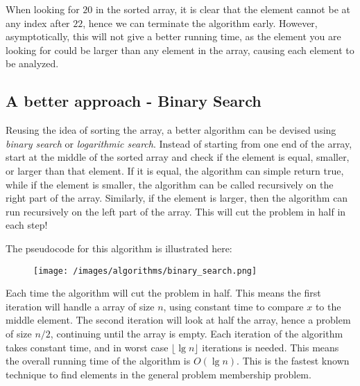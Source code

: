     When looking for $20$ in the sorted array, it is clear that the element cannot be at any index after $22$, hence we can terminate the algorithm early.
    However, asymptotically, this will not give a better running time, as the element you are looking for could be larger than any element in the array, causing each element to be analyzed.

    \subsection{A better approach - Binary Search}

        Reusing the idea of sorting the array, a better algorithm can be devised using \emph{binary search} or \emph{logarithmic search}.
        Instead of starting from one end of the array, start at the middle of the sorted array and check if the element is equal, smaller, or larger than that element.
        If it is equal, the algorithm can simple return true, while if the element is smaller, the algorithm can be called recursively on the right part of the array.
        Similarly, if the element is larger, then the algorithm can run recursively on the left part of the array.
        This will cut the problem in half in each step!


        The pseudocode for this algorithm is illustrated here:

        \begin{figure}[!h]
            \centering
            \texttt{[image: /images/algorithms/binary\_search.png]}
        \end{figure}

        Each time the algorithm will cut the problem in half.
        This means the first iteration will handle a array of size $n$, using constant time to compare $x$ to the middle element.
        The second iteration will look at half the array, hence a problem of size $n/2$, continuing until the array is empty.
        Each iteration of the algorithm takes constant time, and in worst case $\lfloor\lg n \rfloor$ iterations is needed.
        This means the overall running time of the algorithm is $O(\lg n)$.
        This is the fastest known technique to find elements in the general problem membership problem.


